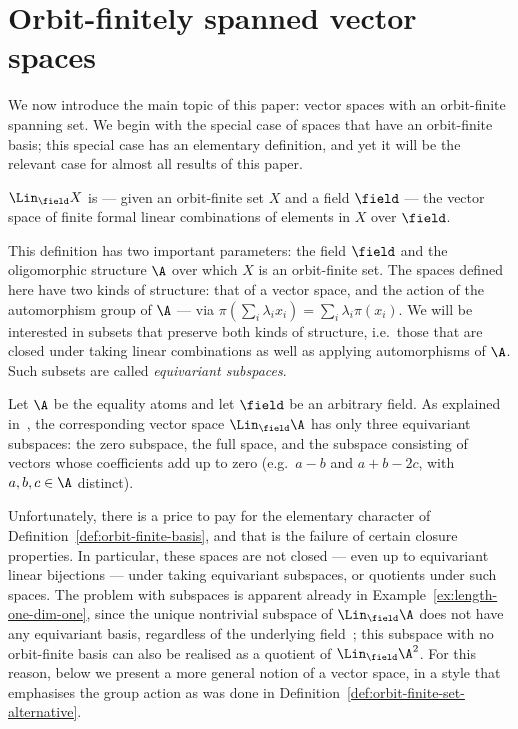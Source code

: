\section{Orbit-finitely spanned vector spaces}\label{sec:spaces}
We now introduce the main topic of this paper: vector spaces with an orbit-finite spanning set. 
We begin with the special case of spaces that have an orbit-finite basis; 
this special case has an elementary definition, and yet it will be the relevant case for almost all results of this paper. 

\begin{definition}\label{def:orbit-finite-basis}
    $\Lin_\field X$ is --- given an orbit-finite set $X$ and a field $\field$ --- the vector space of finite formal linear combinations of elements in $X$ over $\field$.
\end{definition}

This definition has two important parameters: the field $\field$ and the oligomorphic structure $\A$ over which $X$ is an orbit-finite set.
The spaces defined here have two kinds of structure: that of a vector space, and the action of the automorphism group of $\A$
--- via $\pi(\sum_i \lambda_i x_i) = \sum_i \lambda_i \pi(x_i)$. 
We will be interested in subsets that preserve both kinds of structure, 
i.e.~those that are closed under taking linear combinations as well as applying automorphisms of $\A$. 
Such subsets are called \emph{equivariant subspaces}. 


\begin{example}\label{ex:length-one-dim-one}
    Let $\A$ be the equality atoms and let $\field$ be an arbitrary field. 
    As explained in~\cite[Ex.~4.2]{BFKM24}, the corresponding vector space $\Lin_\field \A$ has only three equivariant subspaces: 
    the zero subspace, the full space, and the subspace consisting of vectors whose coefficients add up to zero 
    (e.g.~$a - b$ and $a + b - 2 c$, with $a, b, c \in \A$ distinct). 
\lipicsEnd\end{example}

 Unfortunately, there is a price to pay for the elementary character of Definition~\ref{def:orbit-finite-basis}, 
 and that is the failure of certain closure properties. 
 In particular, these spaces are not closed --- even up to equivariant linear bijections --- under taking equivariant subspaces, or quotients under such spaces. 
 The problem with subspaces is apparent already in Example~\ref{ex:length-one-dim-one}, since the unique nontrivial subspace of $\Lin_\field \A$ does not have any equivariant basis, regardless of the underlying field~\cite[Ex.~6.1]{BFKM24}; 
 this subspace with no orbit-finite basis can also be realised as a quotient of $\Lin_\field \A^2$.
 For this reason, below we present a more general notion of a vector space, in a style that emphasises the group action as was done in Definition~\ref{def:orbit-finite-set-alternative}.

